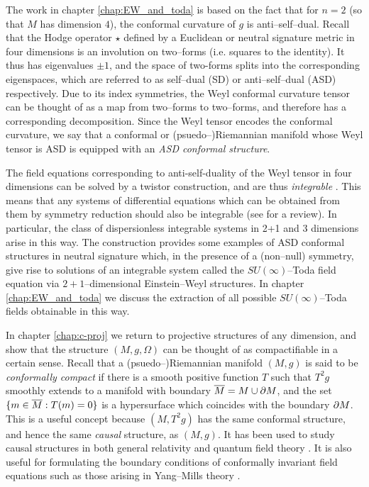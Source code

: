 The work in chapter \ref{chap:EW_and_toda} is based on the fact that for $n=2$ (so that $M$ has dimension $4$), the conformal
curvature of $g$ is anti--self--dual. Recall that the Hodge operator
$\star$ defined by a Euclidean or neutral signature metric in four
dimensions is an involution on two--forms (i.e. squares to the identity).
It thus has eigenvalues $\pm1$, and the space of two-forms splits
into the corresponding eigenspaces, which are referred to as self--dual
(SD) or anti--self--dual (ASD) respectively. Due to its index symmetries,
the Weyl conformal curvature tensor can be thought of as a map from two--forms to two--forms,
and therefore has a corresponding decomposition. Since the Weyl tensor
encodes the conformal curvature, we say that a conformal or (psuedo--)Riemannian
manifold whose Weyl tensor is ASD is equipped with an \textit{ASD
conformal structure}.

The field equations corresponding to anti-self-duality of the Weyl
tensor in four dimensions can be solved by a twistor construction,
and are thus \textit{integrable} \cite{ward}. This means that any systems of differential
equations which can be obtained from them by symmetry reduction should
also be integrable (see \cite{MW} for a review). In particular, the class of dispersionless
integrable systems in 2+1 and 3 dimensions arise in this way. The
construction \cite{DM} provides some examples of
ASD conformal structures in neutral signature which, in the presence
of a (non--null) symmetry, give rise to solutions of an integrable
system called the $SU(\infty)$--Toda field equation via $2+1$--dimensional
Einstein--Weyl structures. In chapter \ref{chap:EW_and_toda} we discuss the extraction
of all possible $SU(\infty)$--Toda fields obtainable in this way.

In chapter \ref{chap:c-proj} we return to projective structures of any dimension, and show that the structure $(M,g,\Omega)$ can be thought of as compactifiable in a certain sense. Recall that a (psuedo--)Riemannian manifold $(M,g)$ is said to be \textit{conformally compact} if there is a smooth positive function $T$ such that $T^2g$ smoothly extends to a manifold with boundary $\overline{M}=M\cup\partial M$, and the set $\{m\in\overline{M}:T(m)=0\}$ is a hypersurface which coincides with the boundary $\partial M$.  This is a useful concept because $(M,T^2g)$ has the same conformal structure, and hence the same \textit{causal} structure, as $(M,g)$. It has been used to study causal structures in both general relativity \cite{penrose65} and quantum field theory \cite{witten}. It is also useful for formulating the boundary conditions of conformally invariant field equations such as those arising in Yang--Mills theory \cite{uhlen}.

